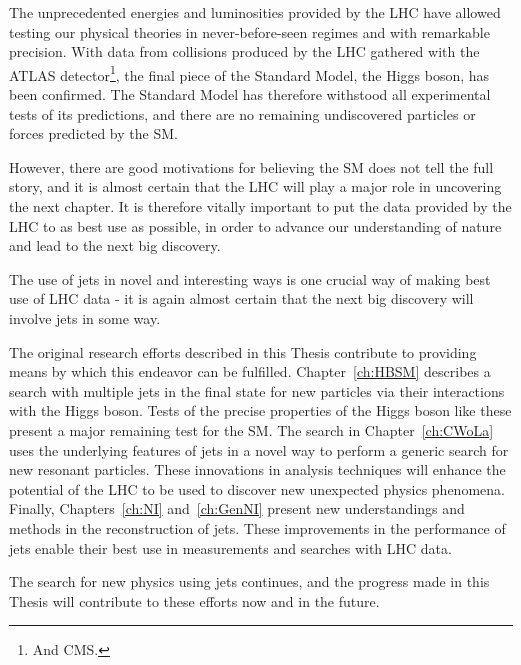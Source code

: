 The unprecedented energies and luminosities provided by the LHC have allowed testing our physical theories in never-before-seen regimes and with remarkable precision.
With data from collisions produced by the LHC gathered with the ATLAS detector\footnote{And CMS.}, the final piece of the Standard Model, the Higgs boson, has been confirmed.
The Standard Model has therefore withstood all experimental tests of its predictions, and there are no remaining undiscovered particles or forces predicted by the SM.

However, there are good motivations for believing the SM does not tell the full story, and it is almost certain that the LHC will play a major role in uncovering the next chapter.
It is therefore vitally important to put the data provided by the LHC to as best use as possible, in order to advance our understanding of nature and lead to the next big discovery.

The use of jets in novel and interesting ways is one crucial way of making best use of LHC data - it is again almost certain that the next big discovery will involve jets in some way.

The original research efforts described in this Thesis contribute to providing means by which this endeavor can be fulfilled.
Chapter~\ref{ch:HBSM} describes a search with multiple jets in the final state for new particles via their interactions with the Higgs boson.
Tests of the precise properties of the Higgs boson like these present a major remaining test for the SM.
The search in Chapter~\ref{ch:CWoLa} uses the underlying features of jets in a novel way to perform a generic search for new resonant particles.
These innovations in analysis techniques will enhance the potential of the LHC to be used to discover new unexpected physics phenomena.
Finally, Chapters~\ref{ch:NI} and~\ref{ch:GenNI} present new understandings and methods in the reconstruction of jets.
These improvements in the performance of jets enable their best use in measurements and searches with LHC data.

The search for new physics using jets continues, and the progress made in this Thesis will contribute to these efforts now and in the future.
